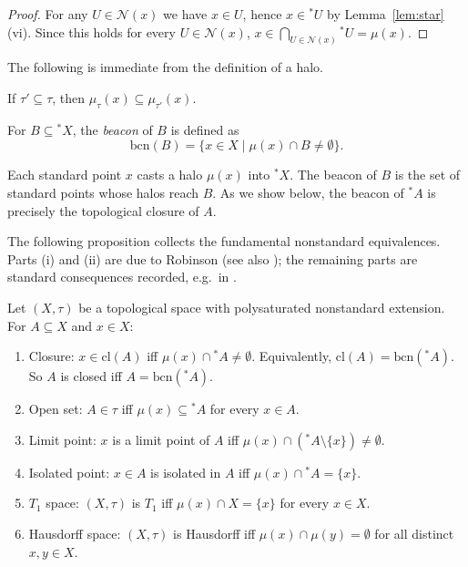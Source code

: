 \documentclass[submission,copyright,creativecommons]{eptcs}
\newcommand{\cl}{\mathrm{cl}}
\newcommand{\st}{\mathrm{bcn}}
\newcommand{\Nbd}{\mathcal{N}}
\newcommand{\str}{{{}^{*}\!}}
\begin{document}
\begin{proof}
For any $U \in \Nbd(x)$ we have $x \in U$, hence $x \in \str U$ by Lemma~\ref{lem:star}(vi). 
Since this holds for every $U \in \Nbd(x)$, $x \in \bigcap_{U \in \Nbd(x)} \str U = \mu(x)$.
\end{proof}
The following is immediate from the definition of a halo.
\begin{lemma}
\label{lem:halomono}
If $\tau' \subseteq \tau$, then $\mu_\tau(x) \subseteq \mu_{\tau'}(x)$.
\end{lemma}

\begin{definition}[beacon]
\label{def:st}
For $B \subseteq \str X$, the \emph{beacon} of $B$ is defined as
\[
  \st(B) = \{ x \in X \mid \mu(x) \cap B \neq \emptyset \}.
\]
\end{definition}

Each standard point $x$ casts a halo $\mu(x)$ into $\str X$. 
The beacon of $B$ is the set of standard points whose halos reach $B$. 
As we show below, the beacon of $\str A$ is precisely the topological closure of $A$.


The following proposition collects the fundamental nonstandard equivalences.
Parts (i) and (ii) are due to Robinson \cite{Robinson1966}
(see also \cite{Luxemburg1969}); the remaining parts are standard consequences recorded, e.g.\ in
\cite{SalbanyTodorov1999}.

\begin{proposition}
\label{prop:nschar}
Let $(X,\tau)$ be a topological space with polysaturated nonstandard extension. For $A \subseteq X$ and $x \in X$:
\begin{enumerate}[label=\textup{(\roman*)}]
  \item Closure:
    $x \in \cl(A)$ iff $\mu(x) \cap \str A \neq \emptyset$.
    Equivalently, $\cl(A) = \st(\str A)$. 
    So $A$ is closed  iff $A=\st(\str A)$.

  \item Open set:
    $A \in \tau$ iff $\mu(x) \subseteq \str A$ for every $x \in A$.

  \item Limit point:
    $x$ is a limit point of $A$ iff $\mu(x) \cap (\str A \setminus \{x\}) \neq \emptyset$.

  \item Isolated point:
    $x \in A$ is isolated in $A$ iff $\mu(x)\cap\str A= \{x\}$.

  \item $T_1$ space:
    $(X,\tau)$ is $T_1$ iff $\mu(x) \cap X = \{x\}$ for every $x \in X$.

  \item Hausdorff space:
    $(X,\tau)$ is Hausdorff iff $\mu(x) \cap \mu(y) = \emptyset$ for all distinct $x, y \in X$.
\end{enumerate}
\end{proposition}
\end{document}
